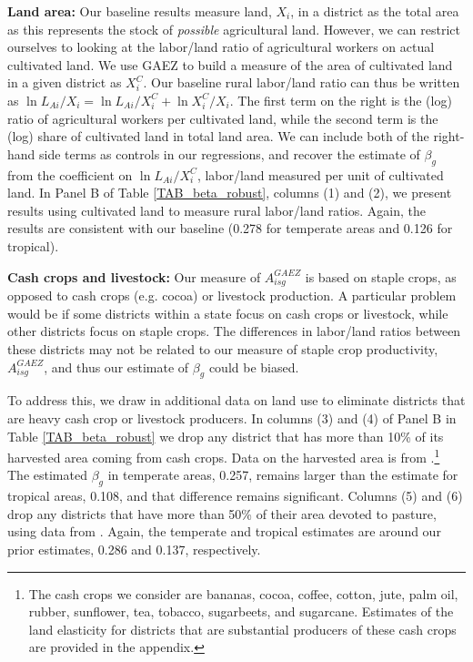 \documentclass[12pt]{article}
\begin{document}
\vspace{.5cm}\noindent\textbf{Land area:} Our baseline results measure land, $X_i$, in a district as the total area as this represents the stock of \textit{possible} agricultural land. However, we can restrict ourselves to looking at the labor/land ratio of agricultural workers on actual cultivated land. We use GAEZ to build a measure of the area of cultivated land in a given district as $X^C_i$. Our baseline rural labor/land ratio can thus be written as $\ln L_{Ai}/X_i = \ln L_{Ai}/X_i^C + \ln X_i^C/X_i$. The first term on the right is the (log) ratio of agricultural workers per cultivated land, while the second term is the (log) share of cultivated land in total land area. We can include both of the right-hand side terms as controls in our regressions, and recover the estimate of $\beta_g$ from the coefficient on $\ln L_{Ai}/X_i^C$, labor/land measured per unit of cultivated land. In Panel B of Table \ref{TAB_beta_robust}, columns (1) and (2), we present results using cultivated land to measure rural labor/land ratios. Again, the results are consistent with our baseline (0.278 for temperate areas and 0.126 for tropical). 

\vspace{.5cm}\noindent\textbf{Cash crops and livestock:} Our measure of $A_{isg}^{GAEZ}$ is based on staple crops, as opposed to cash crops (e.g. cocoa) or livestock production. A particular problem would be if some districts within a state focus on cash crops or livestock, while other districts focus on staple crops. The differences in labor/land ratios between these districts may not be related to our measure of staple crop productivity, $A_{isg}^{GAEZ}$, and thus our estimate of $\beta_g$ could be biased. 

To address this, we draw in additional data on land use to eliminate districts that are heavy cash crop or livestock producers. In columns (3) and (4) of Panel B in Table \ref{TAB_beta_robust} we drop any district that has more than 10\% of its harvested area coming from cash crops. Data on the harvested area is from \cite{mrf2008}.\footnote{The cash crops we consider are bananas, cocoa, coffee, cotton, jute, palm oil, rubber, sunflower, tea, tobacco, sugarbeets, and sugarcane. Estimates of the land elasticity for districts that are substantial producers of these cash crops are provided in the appendix.} The estimated $\beta_g$ in temperate areas, 0.257, remains larger than the estimate for tropical areas, 0.108, and that difference remains significant. Columns (5) and (6) drop any districts that have more than 50\% of their area devoted to pasture, using data from \cite{remf2008}. Again, the temperate and tropical estimates are around our prior estimates, 0.286 and 0.137, respectively.
\end{document}
